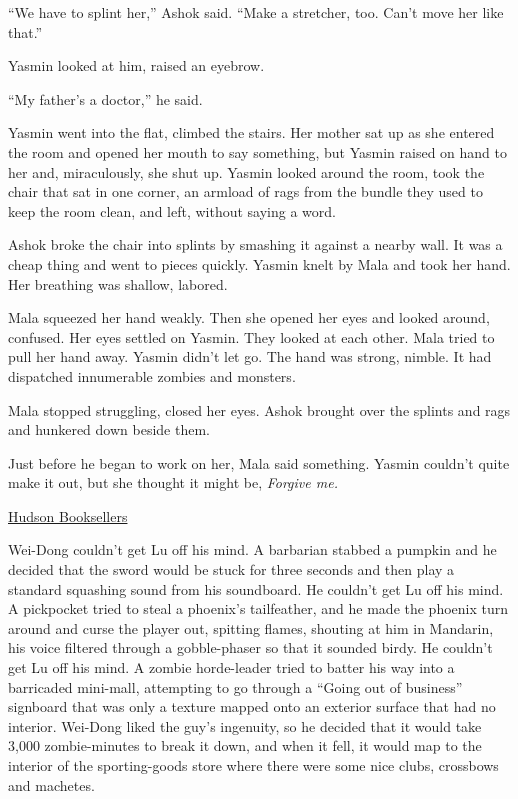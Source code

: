 ``We have to splint her,'' Ashok said. ``Make a stretcher, too. Can't
move her like that.''

Yasmin looked at him, raised an eyebrow.

``My father's a doctor,'' he said.

Yasmin went into the flat, climbed the stairs. Her mother sat up as
she entered the room and opened her mouth to say something, but
Yasmin raised on hand to her and, miraculously, she shut up. Yasmin
looked around the room, took the chair that sat in one corner, an
armload of rags from the bundle they used to keep the room clean,
and left, without saying a word.

Ashok broke the chair into splints by smashing it against a nearby
wall. It was a cheap thing and went to pieces quickly. Yasmin knelt
by Mala and took her hand. Her breathing was shallow, labored.

Mala squeezed her hand weakly. Then she opened her eyes and looked
around, confused. Her eyes settled on Yasmin. They looked at each
other. Mala tried to pull her hand away. Yasmin didn't let go. The
hand was strong, nimble. It had dispatched innumerable zombies and
monsters.

Mala stopped struggling, closed her eyes. Ashok brought over the
splints and rags and hunkered down beside them.

Just before he began to work on her, Mala said something. Yasmin
couldn't quite make it out, but she thought it might be,
\emph{Forgive me.}

\tb

{\href{http://www.hudsongroup.com/HudsonBooksellers\_s.html}{Hudson Booksellers}}

Wei-Dong couldn't get Lu off his mind. A barbarian stabbed a
pumpkin and he decided that the sword would be stuck for three
seconds and then play a standard squashing sound from his
soundboard. He couldn't get Lu off his mind. A pickpocket tried to
steal a phoenix's tailfeather, and he made the phoenix turn around
and curse the player out, spitting flames, shouting at him in
Mandarin, his voice filtered through a gobble-phaser so that it
sounded birdy. He couldn't get Lu off his mind. A zombie
horde-leader tried to batter his way into a barricaded mini-mall,
attempting to go through a ``Going out of business'' signboard that
was only a texture mapped onto an exterior surface that had no
interior. Wei-Dong liked the guy's ingenuity, so he decided that it
would take 3,000 zombie-minutes to break it down, and when it fell,
it would map to the interior of the sporting-goods store where
there were some nice clubs, crossbows and machetes.

